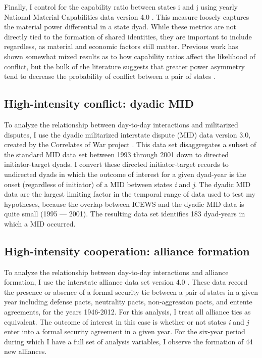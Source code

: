 \documentclass[10pt,]{article}
\begin{document}
Finally, I control for the capability ratio between states i and j using
yearly National Material Capabilities data version 4.0
\citep{Singer1987}. This measure loosely captures the material power
differential in a state dyad. While these metrics are not directly tied
to the formation of shared identities, they are important to include
regardless, as material and economic factors still matter. Previous work
has shown somewhat mixed results as to how capability ratios affect the
likelihood of conflict, but the bulk of the literature suggests that
greater power asymmetry tend to decrease the probability of conflict
between a pair of states \citep[e.g.][]{Organski1980}.

\subsection{High-intensity conflict: dyadic
MID}\label{high-intensity-conflict-dyadic-mid}

To analyze the relationship between day-to-day interactions and
militarized disputes, I use the dyadic militarized interstate dispute
(MID) data version 3.0, created by the Correlates of War project
\citep{Ghosn2003}. This data set disaggregates a subset of the standard
MID data set \citep{Palmer2015} between 1993 through 2001 down to
directed initiator-target dyads. I convert these directed
initiator-target records to undirected dyads in which the outcome of
interest for a given dyad-year is the onset (regardless of initiator) of
a MID between states \emph{i} and \emph{j}. The dyadic MID data are the
largest limiting factor in the temporal range of data used to test my
hypotheses, because the overlap between ICEWS and the dyadic MID data is
quite small (1995 --- 2001). The resulting data set identifies 183
dyad-years in which a MID occurred.

\subsection{High-intensity cooperation: alliance
formation}\label{high-intensity-cooperation-alliance-formation}

To analyze the relationship between day-to-day interactions and alliance
formation, I use the interstate alliance data set version 4.0
\citep{Gibler2004}. These data record the presence or absence of a
formal security tie between a pair of states in a given year including
defense pacts, neutrality pacts, non-aggression pacts, and entente
agreements, for the years 1946-2012. For this analysis, I treat all
alliance ties as equivalent. The outcome of interest in this case is
whether or not states \emph{i} and \emph{j} enter into a formal security
agreement in a given year. For the six-year period during which I have a
full set of analysis variables, I observe the formation of 44 new
alliances.
\end{document}
